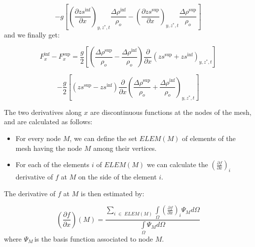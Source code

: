 \begin{equation}
-g\left[  \left(  \frac{\partial zs^{\inf}}{\partial x}\right)  _{y,z^{\ast
},t}\frac{\Delta\rho^{\inf}}{\rho_{o}}-\left(  \frac{\partial zs^{\sup}%
}{\partial x}\right)  _{y,z^{\ast},t}\frac{\Delta\rho^{\sup}}{\rho_{o}%
}\right]
\end{equation}
and we finally get:%

\[
F_{x}^{\inf}-F_{x}^{\sup}=\frac{g}{2}\left[  \left(  \frac{\Delta\rho^{\sup}%
}{\rho_{o}}-\frac{\Delta\rho^{\inf}}{\rho_{o}}\right)  \frac{\partial
}{\partial x}\left(  zs^{\sup}+zs^{\inf}\right)  _{y,z^{\ast},t}\right]
\]
%

\begin{equation}
-\frac{g}{2}\left[  \left(  zs^{\sup}-zs^{\inf}\right)  \frac{\partial
}{\partial x}\left(  \frac{\Delta\rho^{\sup}}{\rho_{o}}+\frac{\Delta\rho
^{\inf}}{\rho_{o}}\right)  _{y,z^{\ast},t}\right]
\end{equation}


The two derivatives along $x$ are discontinuous functions at the nodes of the
mesh, and are calculated as follows:

\begin{itemize}
\item For every node $M$, we can define the set $ELEM(M)$ of elements of the
mesh having the node $M$ among their vertices.

\item For each of the elements $i$ of $ELEM(M)$ we can calculate the $\left(
\frac{\partial f}{\partial x}\right)  _{i}$ derivative of $f$ at $M$ on the
side of the element $i$.
\end{itemize}

The derivative of $f$ at $M$ is then estimated by:%

\begin{equation}
\left(  \frac{\partial f}{\partial x}\right)  \left(  M\right)  =\frac
{\sum\limits_{i\;\in\;ELEM(M)}\int\limits_{\Omega}\left(  \frac{\partial
f}{\partial x}\right)  _{i}\Psi_{M}d\Omega}{\int\limits_{\Omega}\Psi
_{M}d\Omega}%
\end{equation}
where $\Psi_{M}\,$is the basis function associated to node $M$.